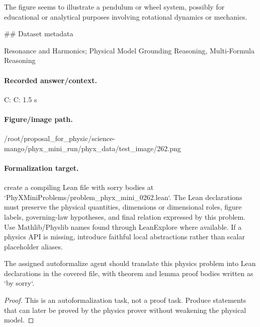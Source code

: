 The figure seems to illustrate a pendulum or wheel system, possibly for educational or analytical purposes involving rotational dynamics or mechanics.

\#\# Dataset metadata

Resonance and Harmonics; Physical Model Grounding Reasoning, Multi-Formula Reasoning

\paragraph{Recorded answer/context.}
C: C: 1.5 s

\paragraph{Figure/image path.}
/root/proposal\_for\_physic/science-mango/phyx\_mini\_run/phyx\_data/test\_image/262.png

\paragraph{Formalization target.}
create a compiling Lean file with sorry bodies at `PhyXMiniProblems/problem\_phyx\_mini\_0262.lean`. The Lean declarations must preserve the physical quantities, dimensions or dimensional roles, figure labels, governing-law hypotheses, and final relation expressed by this problem.
Use Mathlib/Physlib names found through LeanExplore where available. If a physics API is missing, introduce faithful local abstractions rather than scalar placeholder aliases.

\begin{theorem}
\label{thm:physics:phyx_mini_0262:target}
The assigned autoformalize agent should translate this physics problem into Lean declarations in the covered file, with theorem and lemma proof bodies written as `by sorry`.
\end{theorem}
\begin{proof}
This is an autoformalization task, not a proof task. Produce statements that can later be proved by the physics prover without weakening the physical model.
\end{proof}

